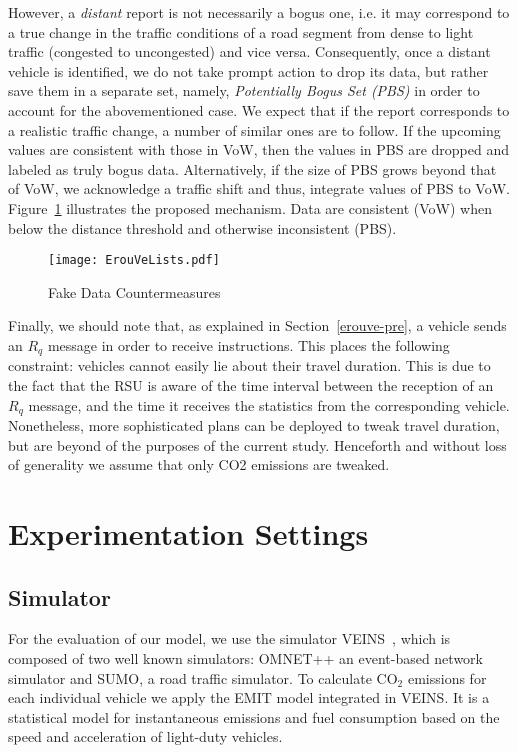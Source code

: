 \documentclass[conference]{IEEEtran}
\begin{document}
However, a {\it distant} report is not necessarily a bogus one, i.e. it may correspond to a true change in the traffic conditions of a road segment from dense
to light traffic (congested to uncongested) and vice versa. Consequently, once a distant vehicle is identified, we do not take prompt action to drop its data, but rather save them in a separate set, namely, {\it Potentially Bogus Set (PBS)}
in order to account for the abovementioned case. We expect that if the report corresponds to a realistic traffic change, a number of similar ones are to follow. If the upcoming values are consistent with those in VoW, then the values in PBS are dropped and labeled as truly bogus
data. Alternatively, if the size of PBS 
grows beyond that of VoW, we acknowledge a traffic shift and thus, integrate values of  PBS to VoW. Figure~\ref{shift-lists} illustrates the proposed mechanism. Data are consistent (VoW) when below the distance threshold and otherwise inconsistent (PBS).
\begin{figure}[!htb]
  \centering
     \texttt{[image: ErouVeLists.pdf]}
  \caption{Fake Data Countermeasures}
  \label{shift-lists}
\end{figure}

Finally, we should note that, as explained in Section~\ref{erouve-pre}, a vehicle sends an $R_{q}$ message in order to 
receive instructions. This places the following constraint: vehicles cannot easily lie about their travel duration. This is due to the fact that the RSU
is aware of the time interval between the reception of an $R_{q}$ message, and the time it receives the statistics from the corresponding vehicle. Nonetheless, more sophisticated plans can be deployed to tweak travel duration, but are beyond of the purposes of the current study. Henceforth and without loss of generality we assume that only CO2 emissions are tweaked.

\section{Experimentation Settings}

\subsection{Simulator}
For the evaluation of our model, we use the simulator VEINS~\cite{sommer2011bidirectionally}, which is composed of two well known simulators: OMNET++ an event-based network
simulator and SUMO, a road traffic simulator. To calculate CO$_2$ emissions for each individual vehicle we apply the EMIT model integrated in VEINS.
It is a statistical model  for instantaneous emissions and fuel consumption based on the speed and acceleration of light-duty vehicles. 
\end{document}
